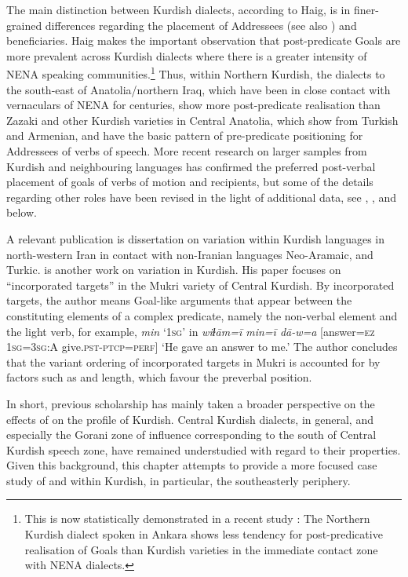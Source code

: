 \documentclass[output=paper,colorlinks,citecolor=brown]{langscibook}
\begin{document}
\begin{sloppypar}
The main distinction between Kurdish dialects, according to Haig, is in finer-grained differences regarding the placement of Addressees (see also \citealt[]{Haig2017Keynote}) and beneficiaries. Haig makes the important observation that post-predicate Goals are more prevalent across Kurdish dialects where there is a greater intensity of NENA speaking communities.\footnote{This is now statistically demonstrated in a recent study \citep[][]{haig_which_2023}{}{}: The Northern Kurdish dialect spoken in Ankara shows less tendency for post-predicative realisation of Goals than Kurdish varieties in the immediate contact zone with NENA dialects.} Thus, within Northern Kurdish, the dialects to the south-east of Anatolia/northern Iraq, which have been in close contact with vernaculars of NENA for centuries, show more post-predicate realisation than Zazaki and other Kurdish varieties in Central Anatolia, which show  from Turkish and  Armenian, and have the basic pattern of pre-predicate positioning for Addressees of verbs of speech. More recent research on larger samples from Kurdish and neighbouring languages has confirmed the preferred post-verbal placement of goals of verbs of motion and recipients, but some of the details regarding other roles have been revised in the light of additional data, see \citet{Haig2022PostPredicateCon}, , and  below.

\begin{sloppypar}
A relevant publication is  dissertation on  variation within Kurdish languages in north-western Iran in contact with non-Iranian languages Neo-Aramaic,  and Turkic. \citet{asadpour_word_2022} is another work on  variation in Kurdish. His paper focuses on ``incorporated targets'' in the Mukri variety of Central Kurdish. By incorporated targets, the author means Goal-like arguments that appear between the constituting elements of a complex predicate, namely the non-verbal element and the light verb, for example, \textit{min} `\textsc{1sg}' in \textit{wiɫām=ī min=ī dā-w=a} [answer=\textsc{ez} \textsc{1sg=3sg:A} give\textsc{.pst-ptcp=perf}] `He gave an answer to me.' The author concludes that the variant ordering of incorporated targets in Mukri is accounted for by factors such as  and length, which favour the preverbal position. 
\end{sloppypar}
In short, previous scholarship has mainly taken a broader perspective on the effects of  on the  profile of Kurdish. Central Kurdish dialects, in general, and especially the Gorani zone of influence corresponding to the south of Central Kurdish speech zone, have remained understudied with regard to their  properties. Given this background, this chapter attempts to provide a more focused case study of  and  within Kurdish, in particular, the southeasterly periphery. 


\end{sloppypar}
\end{document}
